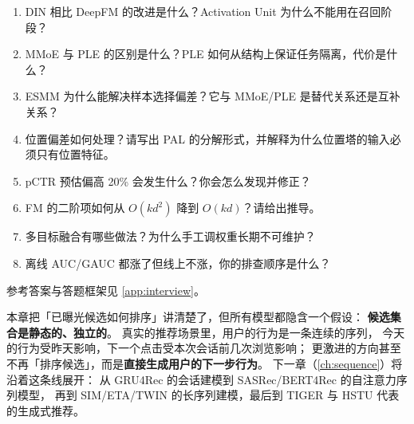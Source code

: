 \begin{interview}[本章对应的面试题]
\begin{enumerate}
  \item DIN 相比 DeepFM 的改进是什么？Activation Unit 为什么不能用在召回阶段？
  \item MMoE 与 PLE 的区别是什么？PLE 如何从结构上保证任务隔离，代价是什么？
  \item ESMM 为什么能解决样本选择偏差？它与 MMoE/PLE 是替代关系还是互补关系？
  \item 位置偏差如何处理？请写出 PAL 的分解形式，并解释为什么位置塔的输入必须只有位置特征。
  \item pCTR 预估偏高 20\% 会发生什么？你会怎么发现并修正？
  \item FM 的二阶项如何从 $O(kd^2)$ 降到 $O(kd)$？请给出推导。
  \item 多目标融合有哪些做法？为什么手工调权重长期不可维护？
  \item 离线 AUC/GAUC 都涨了但线上不涨，你的排查顺序是什么？
\end{enumerate}
参考答案与答题框架见 \cref{app:interview}。
\end{interview}

本章把「已曝光候选如何排序」讲清楚了，但所有模型都隐含一个假设：
\textbf{候选集合是静态的、独立的}。
真实的推荐场景里，用户的行为是一条连续的序列，
今天的行为受昨天影响，下一个点击受本次会话前几次浏览影响；
更激进的方向甚至不再「排序候选」，而是\textbf{直接生成用户的下一步行为}。
下一章（\cref{ch:sequence}）将沿着这条线展开：
从 GRU4Rec 的会话建模到 SASRec/BERT4Rec 的自注意力序列模型，
再到 SIM/ETA/TWIN 的长序列建模，最后到 TIGER 与 HSTU 代表的生成式推荐。
